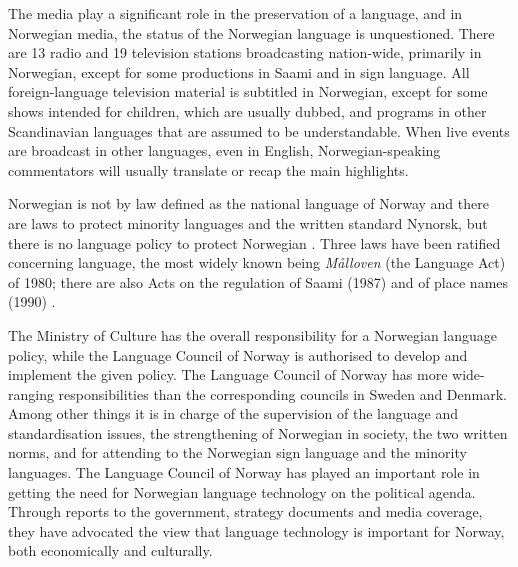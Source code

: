 \begin{multicols}{2}
The media play a significant role in the preservation of a language, and in Norwegian media, the status of the Norwegian language is unquestioned. 
There are 13 radio and 19 television stations broadcasting nation-wide, primarily in Norwegian, except for some productions in Saami and in sign language.
All foreign-language television material is subtitled in Norwegian, except for some shows intended for children, which are usually dubbed, and programs in other Scandinavian languages that are assumed to be understandable. 
When live events are broadcast in other languages, even in English, Norwegian-speaking commentators will usually translate or recap the main highlights. 

Norwegian is not by law defined as the national language of Norway and there are laws to protect minority languages and the written standard Nynorsk, but there is no language policy to protect Norwegian \cite{nih:2005}. 
Three laws have been ratified concerning language, the most widely known being \textit{Målloven} (the Language Act) of 1980; there are also Acts on the regulation of Saami (1987) and of place names (1990) \cite{stm35:2008}.

The Ministry of Culture has the overall responsibility for a Norwegian language policy, while the Language Council of Norway is authorised to develop and implement the given policy. 
The Language Council of Norway has more wide-ranging responsibilities than the corresponding councils in Sweden and Denmark. 
Among other things it is in charge of the supervision of the language and standardisation issues, the strengthening of Norwegian in society, the two written norms, and for attending to the Norwegian sign language and the minority languages. 
The Language Council of Norway has played an important role in getting the need for Norwegian language technology on the political agenda. 
Through reports to the government, strategy documents and media coverage, they have advocated the view that language technology is important for Norway, both economically and culturally.



\end{multicols}
